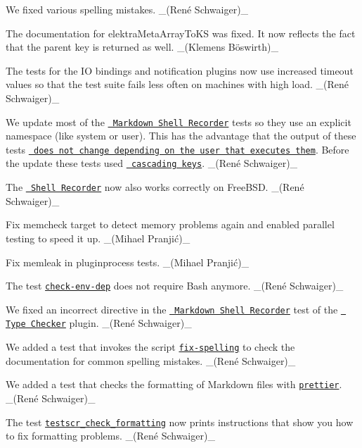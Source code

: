 \begin{DoxyItemize}
\item We fixed various spelling mistakes. \+\_\+(René Schwaiger)\+\_\+
\item The documentation for {\ttfamily elektra\+Meta\+Array\+To\+KS} was fixed. It now reflects the fact that the parent key is returned as well. \+\_\+(Klemens Böswirth)\+\_\+
\end{DoxyItemize}


\begin{DoxyItemize}
\item The tests for the IO bindings and notification plugins now use increased timeout values so that the test suite fails less often on machines with high load. \+\_\+(René Schwaiger)\+\_\+
\item We update most of the \href{https://master.libelektra.org/tests/shell/shell_recorder/tutorial_wrapper}{\texttt{ Markdown Shell Recorder}} tests so they use an explicit namespace (like {\ttfamily system} or {\ttfamily user}). This has the advantage that the output of these tests \href{https://issues.libelektra.org/1773}{\texttt{ does not change depending on the user that executes them}}. Before the update these tests used \href{https://www.libelektra.org/tutorials/namespaces}{\texttt{ cascading keys}}. \+\_\+(René Schwaiger)\+\_\+
\item The \href{https://master.libelektra.org/tests/shell/shell_recorder}{\texttt{ Shell Recorder}} now also works correctly on Free\+B\+SD. \+\_\+(René Schwaiger)\+\_\+
\item Fix memcheck target to detect memory problems again and enabled parallel testing to speed it up. \+\_\+(Mihael Pranjić)\+\_\+
\item Fix memleak in pluginprocess tests. \+\_\+(Mihael Pranjić)\+\_\+
\item The test \href{https://master.libelektra.org/scripts/check-env-dep}{\texttt{ {\ttfamily check-\/env-\/dep}}} does not require Bash anymore. \+\_\+(René Schwaiger)\+\_\+
\item We fixed an incorrect directive in the \href{https://master.libelektra.org/tests/shell/shell_recorder/tutorial_wrapper}{\texttt{ Markdown Shell Recorder}} test of the \href{https://www.libelektra.org/plugins/typechecker}{\texttt{ Type Checker}} plugin. \+\_\+(René Schwaiger)\+\_\+
\item We added a test that invokes the script \href{http://master.libelektra.org/scripts/dev/fix-spelling}{\texttt{ {\ttfamily fix-\/spelling}}} to check the documentation for common spelling mistakes. \+\_\+(René Schwaiger)\+\_\+
\item We added a test that checks the formatting of Markdown files with \href{https://prettier.io}{\texttt{ {\ttfamily prettier}}}. \+\_\+(René Schwaiger)\+\_\+
\item The test \href{https://master.libelektra.org/tests/shell/check_formatting.sh}{\texttt{ {\ttfamily testscr\+\_\+check\+\_\+formatting}}} now prints instructions that show you how to fix formatting problems. \+\_\+(René Schwaiger)\+\_\+
\end{DoxyItemize}


